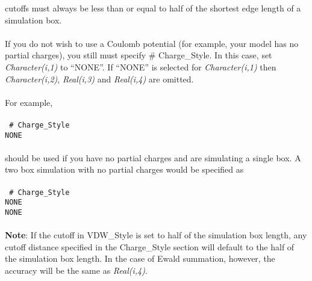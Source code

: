 cutoffs must always be less than or equal to half of the shortest edge
length of a simulation box. \\ \\
%
If you do not wish to use a Coulomb potential (for example, your model
has no partial charges), you still must specify \# Charge\_Style. In
this case, set {\it Character(i,1)} to ``NONE''. If ``NONE'' is
selected for {\it Character(i,1)} then {\it Character(i,2)}, 
{\it  Real(i,3)} and {\it Real(i,4)} are omitted.  
\\ \\
For example, \\ \\
\texttt{
\# Charge\_Style \\
NONE} 
\\ \\
should be used if you have no partial charges and are simulating a
single box. A two box simulation with no partial charges would be
specified as \\ \\
\texttt{
\# Charge\_Style \\
NONE \\
NONE}
\\ \\
%
{\bf{Note}}: If the cutoff in VDW\_Style is set to half of the
simulation box length, any cutoff distance specified in the
Charge\_Style section will default to the half of the simulation box
length. In the case of Ewald summation, however, the accuracy will be
the same as {\it Real(i,4)}. 
%
%
